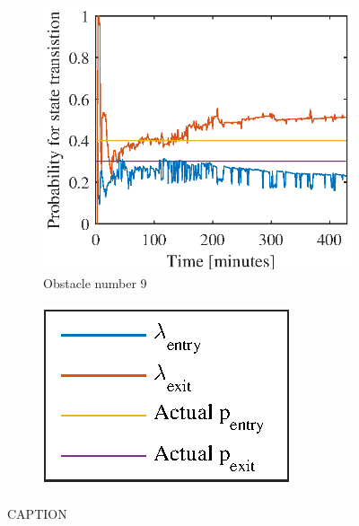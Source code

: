 \begin{figure}[htbp]
	\begin{subfigure}[t]{0.5\linewidth}
		\centering
		\includegraphics[width=1\linewidth]{chapters/appendix/figures/learning_curves/obs9}
		\caption{Obstacle number 9}
	\end{subfigure}
	\hspace*{\fill}
	\begin{subfigure}[t]{0.5\linewidth}
		\centering
		\includegraphics[scale = 1]{chapters/appendix/figures/learning_curves/legend}
	\end{subfigure}

	\caption{CAPTION}
	\label{fig:all_learnings_sim_2}
\end{figure}

